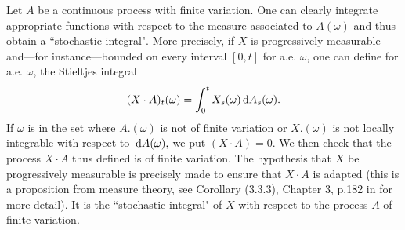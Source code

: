 Let $ A $ be a continuous process with finite variation. One can clearly integrate appropriate functions with respect to the measure associated to $A(\omega)$ and thus obtain a ``stochastic integral". More precisely, if $X$ is progressively measurable and---for instance---bounded on every interval $[0, t]$ for a.e. $\omega$, one can define for a.e. $\omega$, the Stieltjes integral
\[ (X \cdot A)_{t}(\omega)=\int_{0}^{t} X_{s}(\omega) \,\mathrm{d} A_{s}(\omega). \]
 If $\omega$ is in the set where $A.(\omega)$ is not of finite variation or $X.(\omega)$ is not locally integrable with respect to $\,\mathrm{d} A(\omega),$ we put $(X \cdot A)=0$. We then check that the process $X \cdot A$ thus defined is of finite variation. The hypothesis that $X$ be progressively measurable is precisely made to ensure that $X \cdot A$ is adapted (this  is a proposition from measure theory, see Corollary (3.3.3), Chapter 3, p.182 in \cite{bogachev2007measure} for more detail). It is the ``stochastic integral" of $X$ with respect to the process $A$ of finite variation.
%
%
%
%
%
%
%
